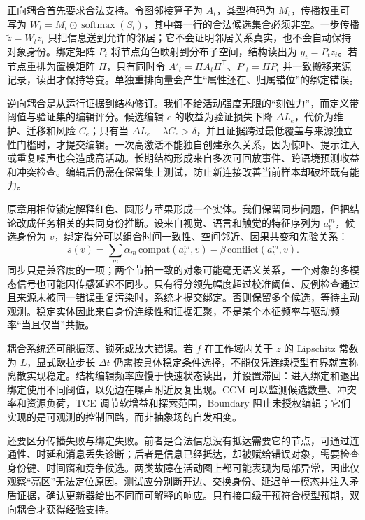 正向耦合首先要求合法支持。令图邻接算子为 $A_t$，类型掩码为 $M_t$，传播权重可写为 $W_t=M_t\odot\operatorname{softmax}(S_t)$，其中每一行的合法候选集合必须非空。一步传播 $\tilde z=W_tz_t$ 只把信息送到允许的邻居；它不会证明邻居关系真实，也不会自动保持对象身份。绑定矩阵 $P_t$ 将节点角色映射到分布子空间，结构读出为 $y_t=P_tz_t$。若节点重排为置换矩阵 $\Pi$，只有同时令 $A'_t=\Pi A_t\Pi^{\mathsf T}$、$P'_t=\Pi P_t$ 并一致搬移来源记录，读出才保持等变。单独重排向量会产生“属性还在、归属错位”的绑定错误。

逆向耦合是从运行证据到结构修订。我们不给活动强度无限的“刻蚀力”，而定义带阈值与验证集的编辑评分。候选编辑 $e$ 的收益为验证损失下降 $\Delta L_e$，代价为维护、迁移和风险 $C_e$；只有当 $\Delta L_e-\lambda C_e>\delta$，并且证据跨过最低覆盖与来源独立性门槛时，才提交编辑。一次高激活不能独自创建永久关系，因为惊吓、提示注入或重复噪声也会造成高活动。长期结构形成来自多次可回放事件、跨语境预测收益和冲突检查。编辑后仍需在保留集上测试，防止新连接改善当前样本却破坏既有能力。

原章用相位锁定解释红色、圆形与苹果形成一个实体。我们保留同步问题，但把结论改成任务相关的共同身份推断。设来自视觉、语言和触觉的特征序列为 $a_t^m$，候选身份为 $v$，绑定得分可以组合时间一致性、空间邻近、因果共变和先验关系：
\begin{equation}
 s(v)=\sum_m\alpha_m\,\mathrm{compat}(a_t^m,v)-\beta\,\mathrm{conflict}(a_t^m,v).
\end{equation}
同步只是兼容度的一项；两个节拍一致的对象可能毫无语义关系，一个对象的多模态信号也可能因传感延迟不同步。只有得分领先幅度超过校准阈值、反例检查通过且来源未被同一错误重复污染时，系统才提交绑定。否则保留多个候选，等待主动观测。稳定实体因此来自身份连续性和证据汇聚，不是某个本征频率与驱动频率“当且仅当”共振。

耦合系统还可能振荡、锁死或放大错误。若 $f$ 在工作域内关于 $z$ 的 Lipschitz 常数为 $L$，显式欧拉步长 $\Delta t$ 仍需按具体稳定条件选择，不能仅凭连续模型有界就宣称离散实现稳定。结构编辑频率应慢于快速状态读出，并设置滞回：进入绑定和退出绑定使用不同阈值，以免边在噪声附近反复出现。CCM 可以监测候选数量、冲突率和资源负荷，TCE 调节软增益和探索范围，Boundary 阻止未授权编辑；它们实现的是可观测的控制回路，而非抽象场的自发相变。

还要区分传播失败与绑定失败。前者是合法信息没有抵达需要它的节点，可通过连通性、时延和消息丢失诊断；后者是信息已经抵达，却被赋给错误对象，需要检查身份键、时间窗和竞争候选。两类故障在活动图上都可能表现为局部异常，因此仅观察“亮区”无法定位原因。测试应分别断开边、交换身份、延迟单一模态并注入矛盾证据，确认更新器给出不同而可解释的响应。只有接口级干预符合模型预期，双向耦合才获得经验支持。

